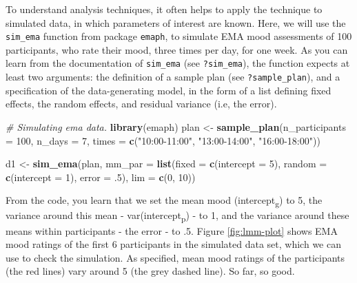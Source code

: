 \documentclass[]{book}
\newenvironment{Shaded}{\begin{snugshade}}{\end{snugshade}}
\newcommand{\KeywordTok}[1]{\textcolor[rgb]{0.13,0.29,0.53}{\textbf{#1}}}
\newcommand{\DataTypeTok}[1]{\textcolor[rgb]{0.13,0.29,0.53}{#1}}
\newcommand{\DecValTok}[1]{\textcolor[rgb]{0.00,0.00,0.81}{#1}}
\newcommand{\StringTok}[1]{\textcolor[rgb]{0.31,0.60,0.02}{#1}}
\newcommand{\CommentTok}[1]{\textcolor[rgb]{0.56,0.35,0.01}{\textit{#1}}}
\newcommand{\NormalTok}[1]{#1}
\begin{document}

To understand analysis techniques, it often helps to apply the technique
to simulated data, in which parameters of interest are known. Here, we
will use the \texttt{sim\_ema} function from package \texttt{emaph}, to
simulate EMA mood assessments of 100 participants, who rate their mood,
three times per day, for one week. As you can learn from the
documentation of \texttt{sim\_ema} (see \texttt{?sim\_ema}), the
function expects at least two arguments: the definition of a sample plan
(see \texttt{?sample\_plan}), and a specification of the data-generating
model, in the form of a list defining fixed effects, the random effects,
and residual variance (i.e, the error).

\begin{Shaded}
\begin{Highlighting}[]
\CommentTok{# Simulating ema data.}
\KeywordTok{library}\NormalTok{(emaph)}
\NormalTok{plan <-}\StringTok{ }\KeywordTok{sample_plan}\NormalTok{(}\DataTypeTok{n_participants =} \DecValTok{100}\NormalTok{, }
                    \DataTypeTok{n_days =} \DecValTok{7}\NormalTok{,}
                    \DataTypeTok{times =} \KeywordTok{c}\NormalTok{(}\StringTok{"10:00-11:00"}\NormalTok{, }
                              \StringTok{"13:00-14:00"}\NormalTok{, }
                              \StringTok{"16:00-18:00"}\NormalTok{))}

\NormalTok{d1 <-}\StringTok{ }\KeywordTok{sim_ema}\NormalTok{(plan, }
              \DataTypeTok{mm_par =} \KeywordTok{list}\NormalTok{(}\DataTypeTok{fixed  =} \KeywordTok{c}\NormalTok{(}\DataTypeTok{intercept =} \DecValTok{5}\NormalTok{),}
                            \DataTypeTok{random =} \KeywordTok{c}\NormalTok{(}\DataTypeTok{intercept =} \DecValTok{1}\NormalTok{),}
                            \DataTypeTok{error =}\NormalTok{ .}\DecValTok{5}\NormalTok{),}
              \DataTypeTok{lim =} \KeywordTok{c}\NormalTok{(}\DecValTok{0}\NormalTok{, }\DecValTok{10}\NormalTok{))}
\end{Highlighting}
\end{Shaded}

From the code, you learn that we set the mean mood
(intercept\textsubscript{g}) to 5, the variance around this mean -
var(intercept\textsubscript{p}) - to 1, and the variance around these
means within participants - the error - to .5. Figure \ref{fig:lmm-plot}
shows EMA mood ratings of the first 6 participants in the simulated data
set, which we can use to check the simulation. As specified, mean mood
ratings of the participants (the red lines) vary around 5 (the grey
dashed line). So far, so good.
\end{document}
